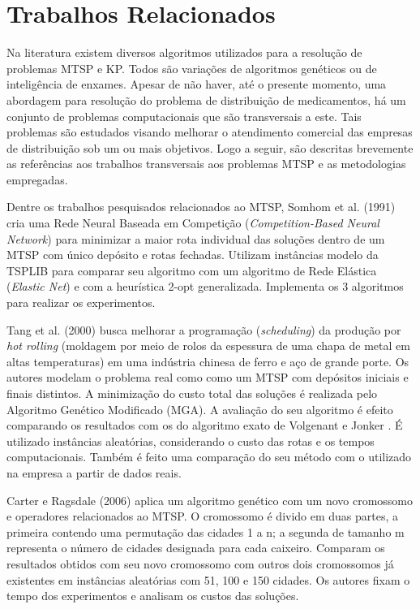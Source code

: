 \chapter{Trabalhos Relacionados}


Na literatura existem diversos algoritmos utilizados para a resolução de problemas MTSP e KP. Todos são variações de algoritmos genéticos ou de inteligência de enxames. Apesar de não haver, até o presente momento, uma abordagem para resolução do problema de distribuição de medicamentos, há um conjunto de problemas computacionais que são transversais a este. Tais problemas são estudados visando melhorar o atendimento comercial das empresas de distribuição sob um ou mais objetivos. Logo a seguir, são descritas brevemente as referências aos trabalhos transversais aos problemas MTSP e as metodologias empregadas.

Dentre os trabalhos pesquisados relacionados ao MTSP, Somhom et al. (1991) \cite{somhom1999competition} cria uma Rede Neural Baseada em Competição (\textit{Competition-Based Neural Network}) para minimizar a maior rota individual das soluções dentro de um MTSP com único depósito e rotas fechadas. Utilizam instâncias modelo da TSPLIB \cite{reinelt1991tsplib} para comparar seu algoritmo com um algoritmo de Rede Elástica (\textit{Elastic Net}) e com a heurística 2-opt generalizada. Implementa os 3 algoritmos para realizar os experimentos.

Tang et al. (2000) \cite{tang2000multiple} busca melhorar a programação (\textit{scheduling}) da produção por \textit{hot rolling} (moldagem por meio de rolos da espessura de uma chapa de metal em altas temperaturas) em uma indústria chinesa de ferro e aço de grande porte. Os autores modelam o problema real como como um MTSP com depósitos iniciais e finais distintos. A minimização do custo total das soluções é realizada pelo Algoritmo Genético Modificado (MGA). A avaliação do seu algoritmo é efeito comparando os resultados com os do algoritmo exato de Volgenant e Jonker \cite{tang2000multiple}. É utilizado instâncias aleatórias, considerando o custo das rotas e os tempos computacionais. Também é feito uma comparação do seu método com o utilizado na empresa a partir de dados reais.

Carter e Ragsdale (2006) \cite{carter2006new} aplica um algoritmo genético com um novo cromossomo e operadores relacionados ao MTSP. O cromossomo é divido em duas partes, a primeira contendo uma permutação das cidades 1 a n; a segunda de tamanho m representa o número de cidades designada para cada caixeiro. Comparam os resultados obtidos com seu novo cromossomo com outros dois cromossomos já existentes em instâncias aleatórias com 51, 100 e 150 cidades. Os autores fixam o tempo dos experimentos e analisam os custos das soluções.

